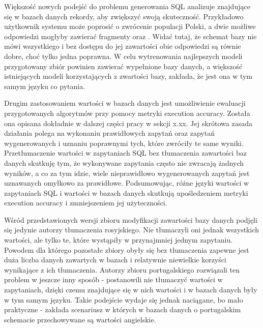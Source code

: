 Większość nowych podejść do problemu generowania SQL analizuje znajdujące się w bazach danych rekordy, aby zwiększyć swoją skuteczność. Przykładowo użytkownik systemu może poprosić o zwrócenie populacji Polski, a dwie możliwe odpowiedzi mogłyby zawierać fragmenty  oraz . Widać tutaj, że schemat bazy nie mówi wszystkiego i bez dostępu do jej zawartości obie odpowiedzi są równie dobre, choć tylko jedna poprawna. W celu wytrenowania najlepszych modeli przygotowany zbiór powinien zawierać wypełnione bazy danych, a większość istniejących modeli korzystających z zwartości bazy, zakłada, że jest ona w tym samym języku co pytania.

Drugim zastosowaniem wartości w bazach danych jest umożliwienie ewaluacji przygotowanych algorytmów przy pomocy metryki execution accuracy. Została ona opisana dokładnie w dalszej części pracy w sekcji x.xx. Jej skrótowa zasada działania polega na wykonaniu prawidłowych zapytań oraz zapytań wygenerowanych i uznaniu poprawnymi tych, które zwróciły te same wyniki. Przetłumaczenie wartości w zapytaniach SQL bez tłumaczenia zawartości baz danych skutkuję tym, że wykonywane zapytania często nie zwracają żadnych wyników, a co za tym idzie, wiele nieprawidłowo wygenerowanych zapytań jest uznawanych omyłkowo za prawidłowe. Podsumowując, różne języki wartości w zapytaniach SQL i wartości w bazach danych skutkują upośledzeniem metryki execution accuracy i zmniejszeniem jej użyteczności.

Wśród przedstawionych wersji zbioru  modyfikacji zawartości bazy danych podjęli się jedynie autorzy tłumaczenia rosyjskiego. Nie tłumaczyli oni jednak wszystkich wartości, ale tylko te, które wystąpiły w przynajmniej jednym zapytaniu. Powodem dla którego pozostałe zbiory obyły się bez tłumaczenia zapewne jest duża liczba danych zawartych w bazach i relatywnie niewielkie korzyści wynikające z ich tłumaczenia. Autorzy zbioru portugalskiego rozwiązali ten problem w jeszcze inny sposób - postanowili nie tłumaczyć wartości w zapytaniach, dzięki czemu znajdujące się w nich wartości i w bazach danych były w tym samym języku. Takie podejście wydaje się jednak naciągane, bo mało praktyczne - zakłada scenariusz w których w bazach danych o portugalskim schemacie przechowywane są wartości angielskie.
